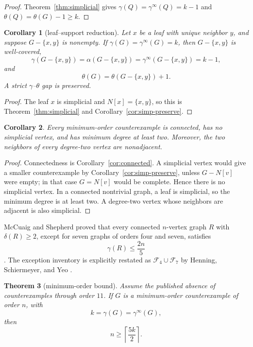 \documentclass[11pt]{article}
\newtheorem{theorem}{Theorem}[section]
\newtheorem{corollary}[theorem]{Corollary}
\theoremstyle{definition}
\theoremstyle{remark}
\newcommand{\gaminf}{\gamma^{\infty}}
\begin{document}
\begin{proof}
Theorem~\ref{thm:simplicial} gives
\(\gamma(Q)=\gaminf(Q)=k-1\) and
\(\theta(Q)=\theta(G)-1\geq k\).
\end{proof}

\begin{corollary}[leaf--support reduction]\label{cor:leaf}
Let \(x\) be a leaf with unique neighbor \(y\), and suppose
\(G-\{x,y\}\) is nonempty.  If
\(\gamma(G)=\gaminf(G)=k\), then \(G-\{x,y\}\) is well-covered,
\[
 \gamma(G-\{x,y\})=\alpha(G-\{x,y\})
 =\gaminf(G-\{x,y\})=k-1,
\]
and
\[
 \theta(G)=\theta(G-\{x,y\})+1.
\]
A strict \(\gamma\)--\(\theta\) gap is preserved.
\end{corollary}

\begin{proof}
The leaf \(x\) is simplicial and \(N[x]=\{x,y\}\), so this is
Theorem~\ref{thm:simplicial} and
Corollary~\ref{cor:simp-preserve}.
\end{proof}

\begin{corollary}\label{cor:no-simplicial}
Every minimum-order counterexample is connected, has no simplicial vertex,
and has minimum degree at least two.  Moreover, the two neighbors of every
degree-two vertex are nonadjacent.
\end{corollary}

\begin{proof}
Connectedness is Corollary~\ref{cor:connected}.  A simplicial vertex would
give a smaller counterexample by Corollary~\ref{cor:simp-preserve}, unless
\(G-N[v]\) were empty; in that case \(G=N[v]\) would be complete.  Hence
there is no simplicial vertex.  In a connected nontrivial graph, a leaf is
simplicial, so the minimum degree is at least two.  A degree-two vertex
whose neighbors are adjacent is also simplicial.
\end{proof}

McCuaig and Shepherd proved that every connected \(n\)-vertex graph \(R\)
with \(\delta(R)\geq2\), except for seven graphs of orders four and seven,
satisfies
\[
  \gamma(R)\leq\frac{2n}{5}
\tag{3.5}
\]
\cite{McCuaigShepherd1989}.  The exception inventory is explicitly
restated as \(\mathcal F_4\cup\mathcal F_7\) by Henning, Schiermeyer, and
Yeo \cite[Theorem 1]{HenningSchiermeyerYeo2011}.

\begin{theorem}[minimum-order bound]\label{thm:five-halves}
Assume the published absence of counterexamples through order \(11\).
If \(G\) is a minimum-order counterexample of order \(n\), with
\[
  k=\gamma(G)=\gaminf(G),
\]
then
\[
  n\geq\left\lceil\frac{5k}{2}\right\rceil.
\tag{3.6}
\]
\end{theorem}
\end{document}
